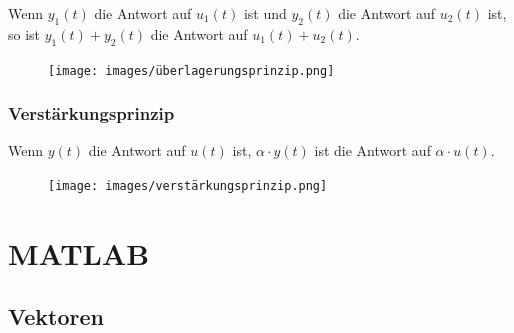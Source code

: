 \documentclass[
  10pt,
  a4paper,
  german]{article}
\numberwithin{equation}{section}
\begin{document}
\begin{multicols}{2}
\begin{tcolorbox}
Wenn \(y_1(t)\) die Antwort auf \(u_1(t)\) ist und \(y_2(t)\) die
Antwort auf \(u_2(t)\) ist, so ist \(y_1(t) + y_2(t)\) die Antwort auf
\(u_1(t) + u_2(t)\).

\begin{figure}[H]

{\centering \texttt{[image: images/überlagerungsprinzip.png]}

}

\end{figure}

\end{tcolorbox}

\hypertarget{verstuxe4rkungsprinzip}{%
\subsubsection{Verstärkungsprinzip}\label{verstuxe4rkungsprinzip}}

\begin{tcolorbox}[enhanced jigsaw, bottomrule=.15mm, coltitle=black, colframe=quarto-callout-important-color-frame, left=2mm, leftrule=.75mm, colback=white, titlerule=0mm, bottomtitle=1mm, breakable, toptitle=1mm, colbacktitle=quarto-callout-important-color!10!white, title=\textcolor{quarto-callout-important-color}{\faExclamation}\hspace{0.5em}{Definition}, opacityback=0, rightrule=.15mm, arc=.35mm, opacitybacktitle=0.6, toprule=.15mm]

Wenn \(y(t)\) die Antwort auf \(u(t)\) ist, \(\alpha\cdot y(t)\) ist die
Antwort auf \(\alpha\cdot u(t)\).

\begin{figure}[H]

{\centering \texttt{[image: images/verstärkungsprinzip.png]}

}

\end{figure}

\end{tcolorbox}

\hypertarget{matlab}{%
\section{MATLAB}\label{matlab}}

\hypertarget{vektoren}{%
\subsection{Vektoren}\label{vektoren}}


\end{multicols}
\end{document}
